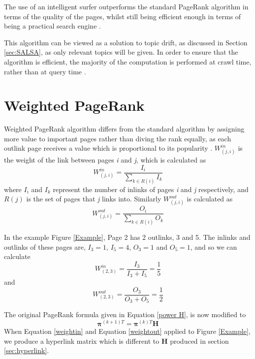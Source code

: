\documentclass[11pt]{report}
\begin{document}
The use of an intelligent surfer outperforms the standard PageRank algorithm in terms of the quality of the pages, whilst still being efficient enough in terms of being a practical search engine \cite{richardson2002intelligent}. 

This algorithm can be viewed as a solution to topic drift, as discussed in Section \ref{sec:SALSA}, as only relevant topics will be  given. In order to ensure that the algorithm is efficient, the majority of the computation is performed at crawl time, rather than at query time \cite{richardson2002intelligent}. 

\section{Weighted PageRank}\label{sec:weighted}
Weighted PageRank algorithm differs from the standard algorithm by assigning more value to important pages rather than diving the rank equally, as each outlink page receives a value which is proportional to its popularity \cite{xing2004weighted}. $W^{in}_{(j,i)}$ is the weight of the link between pages \textit{i} and \textit{j}, which is calculated as 
\begin{equation}\label{weightin}
W^{in}_{(j,i)} = \frac{I_i}{\sum_{k\in R(i)}I_k}
\end{equation}
where $I_i$ and $I_k$ represent the number of inlinks of pages \textit{i} and \textit{j} respectively, and $R(j)$ is the set of pages that \textit{j} links into. 
Similarly $W^{out}_{(j,i)}$ is calculated as
\begin{equation}\label{weightout}
W^{out}_{(j,i)} = \frac{O_i}{\sum_{k\in R(i)}O_k}
\end{equation}

In the example Figure \ref{Example}, Page 2 has 2 outlinks, 3 and 5. The inlinks and outlinks of these pages are, $I_3 = 1$, $I_5 = 4$, $O_3 = 1$ and $O_5 = 1$, and so we can calculate 
\[W^{in}_{(2,3)} = \frac{I_3}{I_3 + I_5} = \frac{1}{5} \]
and 
\[W^{out}_{(2,3)} = \frac{O_3}{O_3 + O_5} = \frac{1}{2} \] 

The original PageRank formula given in Equation \eqref{power H}, is now modified to 
\begin{equation} \label{WPR formula}
\boldsymbol\pi^{(k+1)T} = \boldsymbol\pi^{(k)T}\textbf{H}
\end{equation}
When Equation \eqref{weightin} and Equation \eqref{weightout} applied to Figure \ref{Example}, we produce a hyperlink matrix which is different to \textbf{H} produced in section \ref{sec:hyperlink}. 
\end{document}
